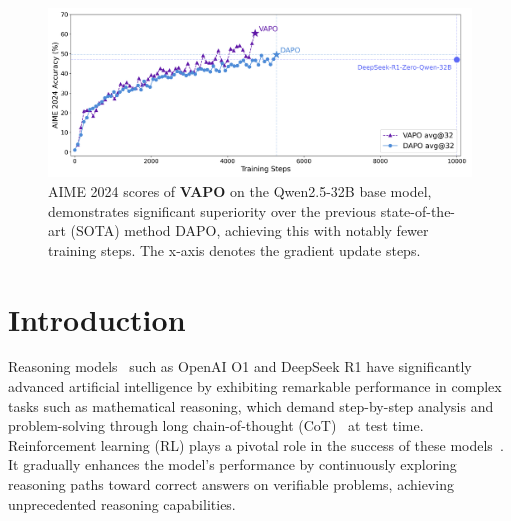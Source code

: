 \vspace{-15pt}
\begin{figure}[h]
    \centering
    \includegraphics[width=0.85\linewidth]{fig/score.png}
    \caption{AIME 2024 scores of \textbf{VAPO} on the Qwen2.5-32B base model, demonstrates significant superiority over the previous state-of-the-art (SOTA) method DAPO, achieving this with notably fewer training steps. The x-axis denotes the gradient update steps.
    }
    \label{fig:front}
\end{figure}

\section{Introduction}



Reasoning models~\cite{gemini-thinking,qwq,k1.5} such as OpenAI O1 \citep{o1} and DeepSeek R1 \citep{deepseekai2025deepseekr1incentivizingreasoningcapability} have significantly advanced artificial intelligence by exhibiting remarkable performance in complex tasks such as mathematical reasoning, which demand step-by-step analysis and problem-solving through long chain-of-thought (CoT)~\cite{cot_2022} at test time.
Reinforcement learning (RL) plays a pivotal role in the success of these models~\cite{k1.5,areal,dapo,shao2024deepseekmath,hu2025reinforce++,rloo,ahmadian2024basicsrevisitingreinforcestyle,sutton1998rl}. It gradually enhances the model's performance by continuously exploring reasoning paths toward correct answers on verifiable problems, achieving unprecedented reasoning capabilities.


